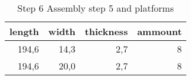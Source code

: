 \begin{table}[h!]
\centering
\caption{Step 6 Assembly step 5 and platforms}
\begin{tabular}{rrrr}
\toprule
 length &  width &  thickness &  ammount \\
\midrule
  194,6 &   14,3 &        2,7 &        8 \\
  194,6 &   20,0 &        2,7 &        8 \\
\bottomrule
\end{tabular}
\end{table}
